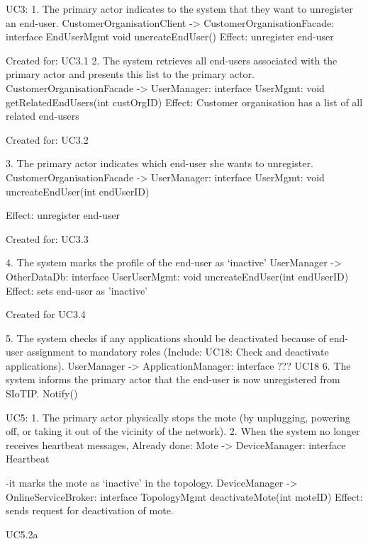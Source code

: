     UC3:
        1. The primary actor indicates to the system that they want to unregister an end-user.
            CustomerOrganisationClient -> CustomerOrganisationFacade: interface EndUserMgmt
                                            void uncreateEndUser()
            Effect: unregister end-user
            \item Created for: UC3.1
        2. The system retrieves all end-users associated with the primary actor and presents this list to
            the primary actor.
            CustomerOrganisationFacade -> UserManager: interface UserMgmt:
                                                void getRelatedEndUsers(int custOrgID)
            Effect: Customer organisation has a list of all related end-users
            \item Created for: UC3.2

        3. The primary actor indicates which end-user she wants to unregister.
             CustomerOrganisationFacade -> UserManager: interface UserMgmt:
                                                void uncreateEndUser(int endUserID)

            Effect: unregister end-user
            \item Created for: UC3.3

        4. The system marks the profile of the end-user as `inactive'
            UserManager -> OtherDataDb: interface UserUserMgmt:
                                                void uncreateEndUser(int endUserID)
            Effect: sets end-user as 'inactive'
            \item Created for UC3.4

        5. The system checks if any applications should be deactivated because of end-user assignment
            to mandatory roles (Include: UC18: Check and deactivate applications).
            UserManager -> ApplicationManager: interface ??? UC18
        6. The system informs the primary actor that the end-user is now unregistered from SIoTIP.
            Notify()

    UC5:
        1. The primary actor physically stops the mote (by unplugging, powering off, or taking it out of
            the vicinity of the network).
        2. When the system no longer receives heartbeat messages,
            Already done: Mote -> DeviceManager: interface Heartbeat

            -it marks the mote as `inactive' in the topology.
            DeviceManager -> OnlineServiceBroker: interface TopologyMgmt deactivateMote(int moteID)
            Effect: sends request for deactivation of mote.
            \item UC5.2a

